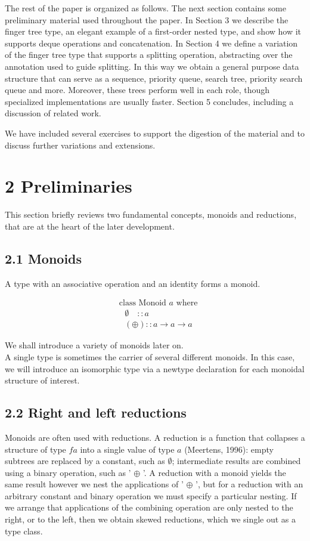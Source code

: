 \documentclass[10pt]{article}
\begin{document}
The rest of the paper is organized as follows. The next section contains some preliminary material used throughout the paper. In Section 3 we describe the finger tree type, an elegant example of a first-order nested type, and show how it supports deque operations and concatenation. In Section 4 we define a variation of the finger tree type that supports a splitting operation, abstracting over the annotation used to guide splitting. In this way we obtain a general purpose data structure that can serve as a sequence, priority queue, search tree, priority search queue and more. Moreover, these trees perform well in each role, though specialized implementations are usually faster. Section 5 concludes, including a discussion of related work.

We have included several exercises to support the digestion of the material and to discuss further variations and extensions.

\section*{2 Preliminaries}
This section briefly reviews two fundamental concepts, monoids and reductions, that are at the heart of the later development.

\subsection*{2.1 Monoids}
A type with an associative operation and an identity forms a monoid.

$$
\begin{aligned}
& \text { class Monoid } a \text { where } \\
& \quad \emptyset \quad:: a \\
& \quad(\oplus):: a \rightarrow a \rightarrow a
\end{aligned}
$$

We shall introduce a variety of monoids later on.\\
A single type is sometimes the carrier of several different monoids. In this case, we will introduce an isomorphic type via a newtype declaration for each monoidal structure of interest.

\subsection*{2.2 Right and left reductions}
Monoids are often used with reductions. A reduction is a function that collapses a structure of type $f a$ into a single value of type $a$ (Meertens, 1996): empty subtrees are replaced by a constant, such as $\emptyset$; intermediate results are combined using a binary operation, such as ' $\oplus$ '. A reduction with a monoid yields the same result however we nest the applications of ' $\oplus$ ', but for a reduction with an arbitrary constant and binary operation we must specify a particular nesting. If we arrange that applications of the combining operation are only nested to the right, or to the left, then we obtain skewed reductions, which we single out as a type class.
\end{document}
